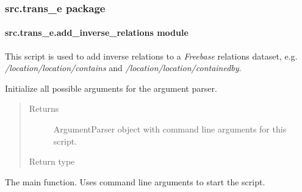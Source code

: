 \documentclass[letterpaper,10pt,english]{sphinxmanual}
\begin{document}
\subsubsection{src.trans\_e package}
\label{src.trans_e:src-trans-e-package}\label{src.trans_e::doc}

\paragraph{src.trans\_e.add\_inverse\_relations module}
\label{src.trans_e:module-src.trans_e.add_inverse_relations}\label{src.trans_e:src-trans-e-add-inverse-relations-module}
This script is used to add inverse relations to a \emph{Freebase} relations dataset, e.g.
\emph{/location/location/contains} and \emph{/location/location/containedby}.

\begin{fulllineitems}
\label{src.trans_e:src.trans_e.add_inverse_relations.add_inverse_relations}
\end{fulllineitems}


\begin{fulllineitems}
\label{src.trans_e:src.trans_e.add_inverse_relations.init_argparse}
Initialize all possible arguments for the argument parser.
\begin{quote}\begin{description}
\item[{Returns}] \leavevmode
ArgumentParser object with command line arguments for this script.

\item[{Return type}] \leavevmode
{}

\end{description}\end{quote}

\end{fulllineitems}


\begin{fulllineitems}
\label{src.trans_e:src.trans_e.add_inverse_relations.main}
The main function. Uses command line arguments to start the script.

\end{fulllineitems}
\end{document}
